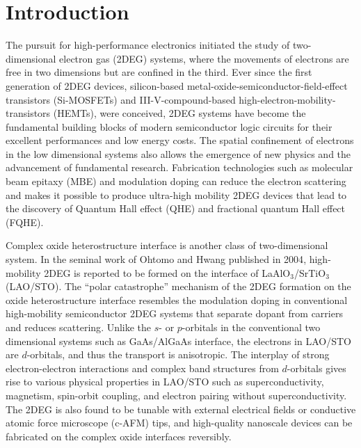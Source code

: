 \documentclass[pdflatex, sectionletters, 12pt, final, phd]{pittetd}    %
\begin{document}
\chapter{Introduction}%
\label{SEC:introduction}

The pursuit for high-performance electronics initiated the study of two-dimensional electron gas (2DEG) systems, where the movements of electrons are free in two dimensions but are confined in the third. Ever since the first generation of 2DEG devices, silicon-based metal-oxide-semiconductor-field-effect transistors (Si-MOSFETs) and III-V-compound-based high-electron-mobility-transistors (HEMTs), were conceived, 2DEG systems have become the fundamental building blocks of modern semiconductor logic circuits for their excellent performances and low energy costs\cite{vinet2017cmos}. The spatial confinement of electrons in the low dimensional systems also allows the emergence of new physics and the advancement of fundamental research. Fabrication technologies such as molecular beam epitaxy (MBE) and modulation doping\cite{dingle1979high} can reduce the electron scattering and makes it possible to produce ultra-high mobility 2DEG devices that lead to the discovery of Quantum Hall effect (QHE)\cite{klitzing1980new} and fractional quantum Hall effect (FQHE)\cite{chang1983fractional}.

Complex oxide heterostructure interface is another class of two-dimensional system. In the seminal work of Ohtomo and Hwang published in 2004\cite{ohtomo2004high}, high-mobility 2DEG is reported to be formed on the interface of LaAlO$_3$/SrTiO$_3$ (LAO/STO). The ``polar catastrophe'' mechanism\cite{nakagawa2006some} of the 2DEG formation on the oxide heterostructure interface resembles the modulation doping in conventional high-mobility semiconductor 2DEG systems that separate dopant from carriers and reduces scattering\cite{bogorin2010laalo3}. Unlike the $s$- or $p$-orbitals in the conventional two dimensional systems such as GaAs/AlGaAs interface, the electrons in LAO/STO are $d$-orbitals\cite{salluzzo2009orbital}, and thus the transport is anisotropic\cite{annadi2013anisotropic}. The interplay of strong electron-electron interactions\cite{hwang2012emergent} and complex band structures from $d$-orbitals\cite{salluzzo2009orbital} gives rise to various physical properties in LAO/STO such as superconductivity\cite{reyren2007superconducting}, magnetism\cite{brinkman2007magnetic}, spin-orbit coupling\cite{caviglia2010tunable}, and electron pairing without superconductivity\cite{cheng2015electron}. The 2DEG is also found to be tunable with external electrical fields\cite{thiel2006tunable} or conductive atomic force microscope (c-AFM) tips\cite{cen2008nanoscale}, and high-quality nanoscale devices can be fabricated on the complex oxide interfaces reversibly\cite{cen2009oxide, irvin2010rewritable, cheng2011sketched, jnawali2015photoconductive, tomczyk2016micrometer, jiang2017direct, chen2019over, sutton2018100, chen2017ultrafast, briggeman2019engineered, hao2019toward, nethwewala2018quantum, tang2017magnetically, pai2019superconductivity, pai2018physics, nethwewala2019inhomogeneous}.
\end{document}
